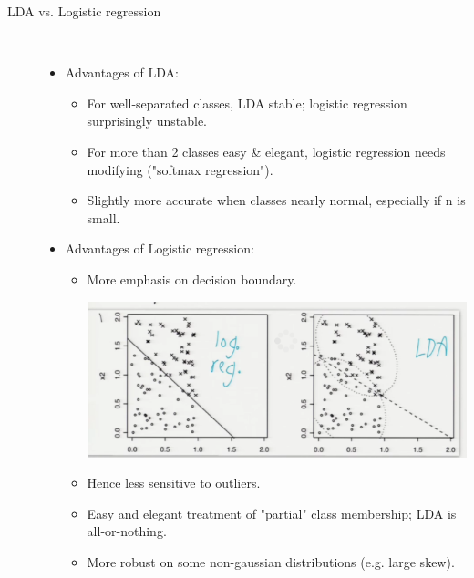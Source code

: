 \documentclass[10pt]{article}
\begin{document}
\begin{description}
			\item[LDA vs. Logistic regression]
			\
				\begin{itemize}
					\item Advantages of LDA:
						\begin{itemize}
							\item For well-separated classes, LDA stable; logistic regression surprisingly unstable.
							\item For more than 2 classes easy \& elegant, logistic regression needs modifying ("softmax regression").
							\item Slightly more accurate when classes nearly normal, especially if n is small.
						\end{itemize}
					\item Advantages of Logistic regression:
						\begin{itemize}
							\item More emphasis on decision boundary.
							\begin{center}
								\includegraphics[scale=0.5]{images/ldavsregression}
							\end{center}
							\item Hence less sensitive to outliers.
							\item Easy and elegant treatment of "partial" class membership; LDA is all-or-nothing.
							\item More robust on some non-gaussian distributions (e.g. large skew).
						\end{itemize}
				\end{itemize}
\end{description}
\end{document}
